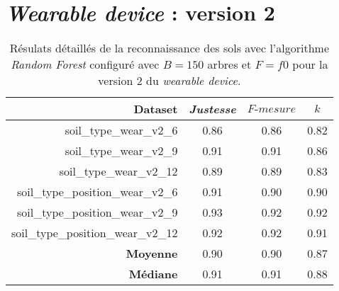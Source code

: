 \section{\textit{Wearable device} : version 2}
\label{anx:a2}
\begin{table}[H]\renewcommand{\arraystretch}{0.5}
	\centering
	\caption{Résulats détaillés de la reconnaissance des sols avec l'algorithme \textit{Random Forest} configuré avec $B=150$ arbres et $F=f0$ pour la version 2 du \textit{wearable device}.}
	\label{tab:tab:rf-150-f0-wear-v2}
	\begin{tabular}{@{}rccc@{}}
		\toprule
			\textbf{Dataset} & \textit{Justesse} & $F\mbox{-} mesure$ & \textbf{$k$} \\
		\midrule
			soil\_type\_wear\_v2\_6 & 0.86 & 0.86 & 0.82 \\
			soil\_type\_wear\_v2\_9 & 0.91 & 0.91 & 0.86 \\
			soil\_type\_wear\_v2\_12 & 0.89 & 0.89 & 0.83 \\
			soil\_type\_position\_wear\_v2\_6 & 0.91 & 0.90 & 0.90 \\
			soil\_type\_position\_wear\_v2\_9 & 0.93 & 0.92 & 0.92 \\
			soil\_type\_position\_wear\_v2\_12 & 0.92 & 0.92 & 0.91 \\
			\textbf{Moyenne} & 0.90 & 0.90 & 0.87 \\
			\textbf{Médiane} & 0.91 & 0.91 & 0.88 \\
		\bottomrule
	\end{tabular}
\end{table}

